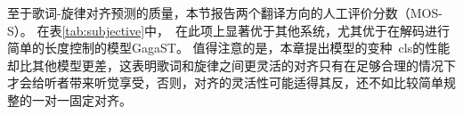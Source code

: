 至于歌词-旋律对齐预测的质量，本节报告两个翻译方向的人工评价分数（MOS-S）。
在表\ref{tab:subjective}中，\modelname~在此项上显著优于其他系统，尤其优于在解码进行简单的长度控制的模型GagaST。
值得注意的是，本章提出模型的变种\modelname~cls的性能却比其他模型更差，这表明歌词和旋律之间更灵活的对齐只有在足够合理的情况下才会给听者带来听觉享受，否则，对齐的灵活性可能适得其反，还不如比较简单规整的一对一固定对齐。
